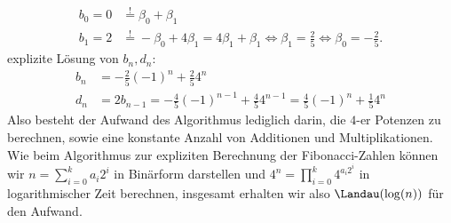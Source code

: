 \begin{solution}
\begin{enumerate}[label = \alph*)]
  \begin{align*}
    b_0 = 0 &\stackrel{!}{=} \beta_0 + \beta_1 \\
    b_1 = 2 &\stackrel{!}{=} -\beta_0 + 4\beta_1 = 4\beta_1 + \beta_1 \iff \beta_1 = \frac{2}{5} \iff \beta_0 = -\frac{2}{5}.
  \end{align*}
  explizite Lösung von $b_n,d_n$:
  \begin{align*}
    b_n &= -\frac{2}{5}(-1)^n + \frac{2}{5}4^n \\
    d_n &= 2b_{n-1} = -\frac{4}{5}(-1)^{n-1} + \frac{4}{5}4^{n-1} = \frac{4}{5}(-1)^n + \frac{1}{5}4^n
  \end{align*}
  Also besteht der Aufwand des Algorithmus lediglich darin, die $4$-er Potenzen
  zu berechnen, sowie eine konstante Anzahl von Additionen und Multiplikationen.
  Wie beim Algorithmus zur expliziten Berechnung der Fibonacci-Zahlen können
  wir $n = \sum_{i=0}^k a_i2^i$ in Binärform darstellen und $4^n = \prod_{i=0}^k 4^{a_i 2^i}$
  in logarithmischer Zeit berechnen, insgesamt erhalten wir also $\Landau(\log(n))$
  für den Aufwand. 
\end{enumerate}


\end{solution}

